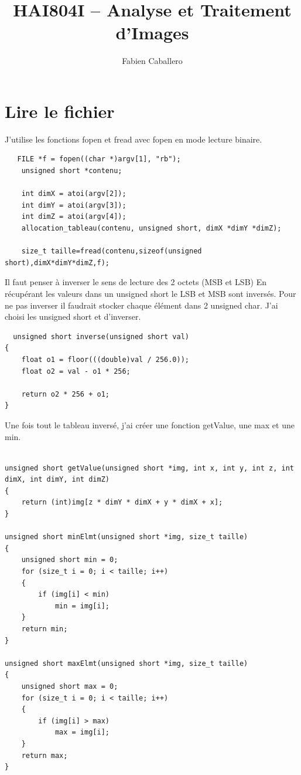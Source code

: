 \documentclass{article}
\title{HAI804I – Analyse et Traitement d'Images}
\author{Fabien Caballero }
\begin{document}
  

\maketitle
    \tableofcontents

\newpage

\section{Lire le fichier}
J'utilise les fonctions fopen et fread avec fopen en mode lecture binaire.
\begin{lstlisting}
   FILE *f = fopen((char *)argv[1], "rb");
    unsigned short *contenu;

    int dimX = atoi(argv[2]);
    int dimY = atoi(argv[3]);
    int dimZ = atoi(argv[4]);
    allocation_tableau(contenu, unsigned short, dimX *dimY *dimZ);

    size_t taille=fread(contenu,sizeof(unsigned short),dimX*dimY*dimZ,f);
\end{lstlisting}

Il faut penser à inverser le sens de lecture des 2 octets (MSB et LSB)
En récupérant les valeurs dans un unsigned short le LSB et MSB sont inversés.
Pour ne pas inverser il faudrait stocker chaque élément dans 2 unsigned char.
J'ai choisi les unsigned short et d'inverser.

\begin{lstlisting}
  unsigned short inverse(unsigned short val)
{
    float o1 = floor(((double)val / 256.0));
    float o2 = val - o1 * 256;

    return o2 * 256 + o1;
}
\end{lstlisting}

Une fois tout le tableau inversé, j'ai créer une fonction getValue, une max et une min.
\begin{lstlisting}

unsigned short getValue(unsigned short *img, int x, int y, int z, int dimX, int dimY, int dimZ)
{
    return (int)img[z * dimY * dimX + y * dimX + x];
}

unsigned short minElmt(unsigned short *img, size_t taille)
{
    unsigned short min = 0;
    for (size_t i = 0; i < taille; i++)
    {
        if (img[i] < min)
            min = img[i];
    }
    return min;
}

unsigned short maxElmt(unsigned short *img, size_t taille)
{
    unsigned short max = 0;
    for (size_t i = 0; i < taille; i++)
    {
        if (img[i] > max)
            max = img[i];
    }
    return max;
}

\end{lstlisting}
\end{document}
